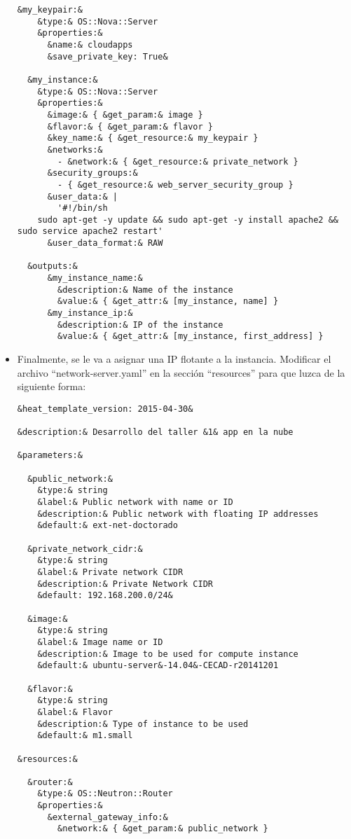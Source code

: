 \documentclass[10pt]{article}   			%
\begin{document}
\begin{itemize}
\begin{small}
\begin{lstlisting}[frame=single,style=base]
  &my_keypair:&
    &type:& OS::Nova::Server
    &properties:&
      &name:& cloudapps
      &save_private_key: True&

  &my_instance:&
    &type:& OS::Nova::Server
    &properties:&
      &image:& { &get_param:& image }
      &flavor:& { &get_param:& flavor }
      &key_name:& { &get_resource:& my_keypair }
      &networks:&
        - &network:& { &get_resource:& private_network }
      &security_groups:&
        - { &get_resource:& web_server_security_group }
      &user_data:& | 
        '#!/bin/sh
	sudo apt-get -y update && sudo apt-get -y install apache2 && sudo service apache2 restart'
      &user_data_format:& RAW

  &outputs:&
      &my_instance_name:&
        &description:& Name of the instance
        &value:& { &get_attr:& [my_instance, name] }
      &my_instance_ip:&
        &description:& IP of the instance
        &value:& { &get_attr:& [my_instance, first_address] }
\end{lstlisting}
\end{small}

\item Finalmente, se le va a asignar una IP flotante a la instancia. Modificar el archivo “network-server.yaml” en la sección “resources” para que luzca de la siguiente forma:
\begin{small}
\begin{lstlisting}[frame=single,style=base]	
&heat_template_version: 2015-04-30&

&description:& Desarrollo del taller &1& app en la nube

&parameters:&

  &public_network:&
    &type:& string
    &label:& Public network with name or ID
    &description:& Public network with floating IP addresses
    &default:& ext-net-doctorado

  &private_network_cidr:&
    &type:& string
    &label:& Private network CIDR
    &description:& Private Network CIDR
    &default: 192.168.200.0/24&

  &image:&
    &type:& string
    &label:& Image name or ID
    &description:& Image to be used for compute instance
    &default:& ubuntu-server&-14.04&-CECAD-r20141201

  &flavor:&
    &type:& string
    &label:& Flavor
    &description:& Type of instance to be used
    &default:& m1.small

&resources:&

  &router:&
    &type:& OS::Neutron::Router
    &properties:&
      &external_gateway_info:&
        &network:& { &get_param:& public_network }


\end{lstlisting}
\end{small}
\end{itemize}
\end{document}
